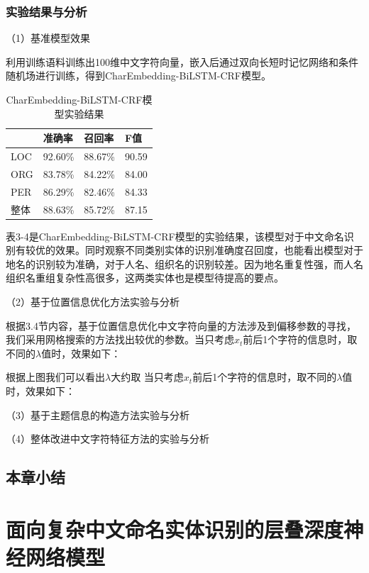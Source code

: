 \documentclass[winfonts,master,oneside,nobackinfo]{njuthesis}
\begin{document}
\subsection{实验结果与分析}

（1）基准模型效果

利用训练语料训练出100维中文字符向量，嵌入后通过双向长短时记忆网络和条件随机场进行训练，得到CharEmbedding-BiLSTM-CRF模型。

\begin{table}[H]
\centering
\begin{tabular}{|l|l|l|l|}
\hline
    & 准确率     & 召回率     & F值    \\ \hline
LOC & 92.60\% & 88.67\% & 90.59 \\ \hline
ORG & 83.78\% & 84.22\% & 84.00 \\ \hline
PER & 86.29\% & 82.46\% & 84.33 \\ \hline
整体  & 88.63\% & 85.72\% & 87.15 \\ \hline
\end{tabular}
\caption{CharEmbedding-BiLSTM-CRF模型实验结果}
\end{table}

表3-4是CharEmbedding-BiLSTM-CRF模型的实验结果，该模型对于中文命名识别有较优的效果。同时观察不同类别实体的识别准确度召回度，也能看出模型对于地名的识别较为准确，对于人名、组织名的识别较差。因为地名重复性强，而人名组织名重组复杂性高很多，这两类实体也是模型待提高的要点。

（2）基于位置信息优化方法实验与分析

根据3.4节内容，基于位置信息优化中文字符向量的方法涉及到偏移参数的寻找，我们采用网格搜索的方法找出较优的参数。当只考虑$x_{t}$前后1个字符的信息时，取不同的$\lambda$值时，效果如下：



根据上图我们可以看出$\lambda$大约取
当只考虑$x_{t}$前后1个字符的信息时，取不同的$\lambda$值时，效果如下：


（3）基于主题信息的构造方法实验与分析




（4）整体改进中文字符特征方法的实验与分析




\section{本章小结}





\chapter{面向复杂中文命名实体识别的层叠深度神经网络模型}
\end{document}
